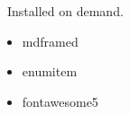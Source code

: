 \documentclass{article}
\begin{document}
\begin{mdframed}
\faGithub\ Installed on demand.
\begin{itemize}[label=\faCheck]
  \item mdframed
  \item enumitem
  \item fontawesome5
\end{itemize}
\end{mdframed}
\end{document}
